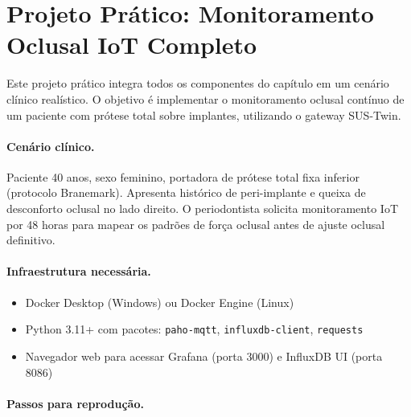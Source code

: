 \section{Projeto Prático: Monitoramento Oclusal IoT Completo}

Este projeto prático integra todos os componentes do capítulo em um cenário clínico realístico. O objetivo é implementar o monitoramento oclusal contínuo de um paciente com prótese total sobre implantes, utilizando o gateway SUS-Twin.

\paragraph{Cenário clínico.} Paciente 40 anos, sexo feminino, portadora de prótese total fixa inferior (protocolo Branemark). Apresenta histórico de peri-implante e queixa de desconforto oclusal no lado direito. O periodontista solicita monitoramento IoT por 48 horas para mapear os padrões de força oclusal antes de ajuste oclusal definitivo.

\paragraph{Infraestrutura necessária.}
\begin{itemize}
    \item Docker Desktop (Windows) ou Docker Engine (Linux)
    \item Python 3.11+ com pacotes: \texttt{paho-mqtt}, \texttt{influxdb-client}, \texttt{requests}
    \item Navegador web para acessar Grafana (porta 3000) e InfluxDB UI (porta 8086)
\end{itemize}

\paragraph{Passos para reprodução.}

